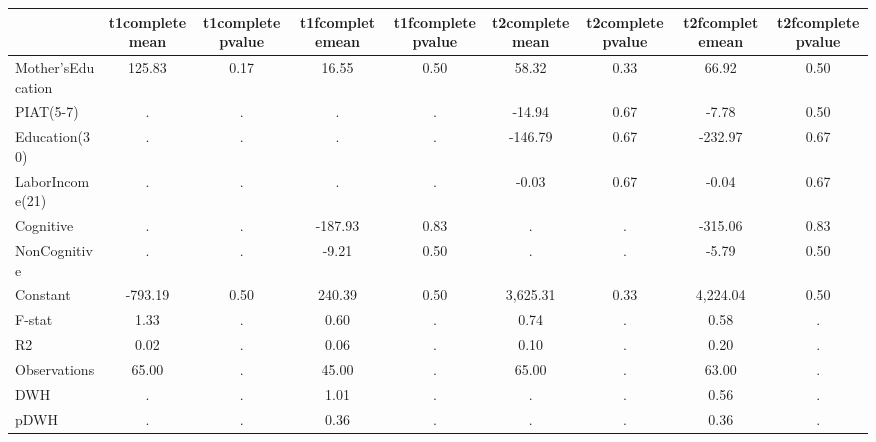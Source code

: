 \begin{table}[htbp]
\begin{tabular}{lcccccccc} \hline \hline
 & t1completemean  & t1completepvalue  & t1fcompletemean  & t1fcompletepvalue  & t2completemean  & t2completepvalue  & t2fcompletemean  & t2fcompletepvalue  \\  \hline 
Mother'sEducation &       125.83 &         0.17 &        16.55 &         0.50 &        58.32 &         0.33 &        66.92 &         0.50 \\  
PIAT(5-7) &            . &            . &            . &            . &       -14.94 &         0.67 &        -7.78 &         0.50 \\  
Education(30) &            . &            . &            . &            . &      -146.79 &         0.67 &      -232.97 &         0.67 \\  
LaborIncome(21) &            . &            . &            . &            . &        -0.03 &         0.67 &        -0.04 &         0.67 \\  
Cognitive &            . &            . &      -187.93 &         0.83 &            . &            . &      -315.06 &         0.83 \\  
NonCognitive &            . &            . &        -9.21 &         0.50 &            . &            . &        -5.79 &         0.50 \\  
Constant &      -793.19 &         0.50 &       240.39 &         0.50 &     3,625.31 &         0.33 &     4,224.04 &         0.50 \\  
F-stat &         1.33 &            . &         0.60 &            . &         0.74 &            . &         0.58 &            . \\  
R2 &         0.02 &            . &         0.06 &            . &         0.10 &            . &         0.20 &            . \\  
Observations &        65.00 &            . &        45.00 &            . &        65.00 &            . &        63.00 &            . \\  
DWH &            . &            . &         1.01 &            . &            . &            . &         0.56 &            . \\  
pDWH &            . &            . &         0.36 &            . &            . &            . &         0.36 &            . \\  
\hline \hline \end{tabular}
\end{table}
